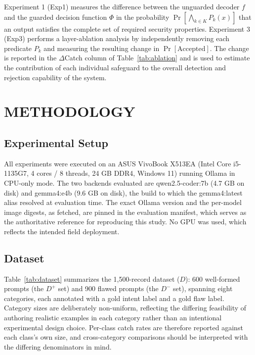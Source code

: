 \documentclass[a4paper,twoside]{article}
\begin{document}
Experiment 1 (Exp1) measures the difference between the unguarded decoder $f$ and the guarded decision function $\Phi$ in the probability $\Pr[\bigwedge_{k\in K} P_k(x)]$ that an output satisfies the complete set of required security properties. Experiment 3 (Exp3) performs a layer-ablation analysis by independently removing each predicate $P_k$ and measuring the resulting change in $\Pr[\mathrm{Accepted}]$. The change is reported in the $\Delta$Catch column of Table~\ref{tab:ablation} and is used to estimate the contribution of each individual safeguard to the overall detection and rejection capability of the system.


\section{\uppercase{Methodology}}
\label{sec:method}

\subsection{Experimental Setup}

\noindent All experiments were executed on an ASUS VivoBook X513EA (Intel Core i5-1135G7, 4 cores / 8 threads, 24 GB DDR4, Windows 11) running Ollama in CPU-only mode. The two backends evaluated are qwen2.5-coder:7b (4.7 GB on disk) and gemma4:e4b (9.6 GB on disk), the build to which the gemma4:latest alias resolved at evaluation time. The exact Ollama version and the per-model image digests, as fetched, are pinned in the evaluation manifest, which serves as the authoritative reference for reproducing this study. No GPU was used, which reflects the intended field deployment.

\subsection{Dataset}

\noindent Table~\ref{tab:dataset} summarizes the 1,500-record dataset ($D$): 600 well-formed prompts (the $D^+$ set) and 900 flawed prompts (the $D^-$ set), spanning eight categories, each annotated with a gold intent label and a gold flaw label. Category sizes are deliberately non-uniform, reflecting the differing feasibility of authoring realistic examples in each category rather than an intentional experimental design choice. Per-class catch rates are therefore reported against each class's own size, and cross-category comparisons should be interpreted with the differing denominators in mind.
\end{document}
